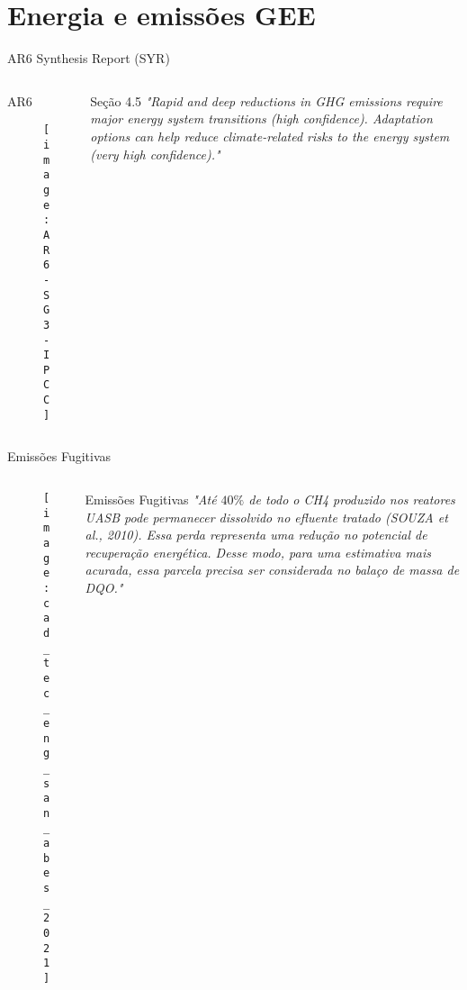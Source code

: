\documentclass{beamer}
\begin{document}
\section{Energia e emissões GEE}

\begin{frame}{AR6 Synthesis Report (SYR)}
\begin{columns}
\begin{column}{5cm}
\begin{block}{AR6}
\begin{figure}[ht] 
    \texttt{[image: AR6-SG3-IPCC]} 
    \end{figure}
\end{block}
\end{column}
\begin{column}{5cm}
\begin{block}{Seção 4.5}
{\it "Rapid and deep reductions in GHG emissions require major energy system transitions (high confidence). Adaptation options can help reduce climate-related risks to the energy system (very high confidence)."}
\end{block}
\end{column}
\end{columns}
\end{frame}



\begin{frame}{Emissões Fugitivas}
\begin{columns}
\begin{column}{5cm}
\begin{block}{}
\begin{figure}[ht] 
    \texttt{[image: cad\_tec\_eng\_san\_abes\_2021]} 
    \end{figure}
\end{block}
\end{column}
\begin{column}{5cm}
\begin{block}{Emissões Fugitivas}
{\it "Até $40\%$ de todo o CH4 produzido nos reatores UASB pode
permanecer dissolvido no efluente tratado (SOUZA et al., 2010).
Essa perda representa uma redução no potencial de
recuperação energética. Desse modo, para uma estimativa
mais acurada, essa parcela precisa ser considerada no balaço
de massa de DQO."}
\end{block}
\end{column}
\end{columns}
\end{frame}
\end{document}
